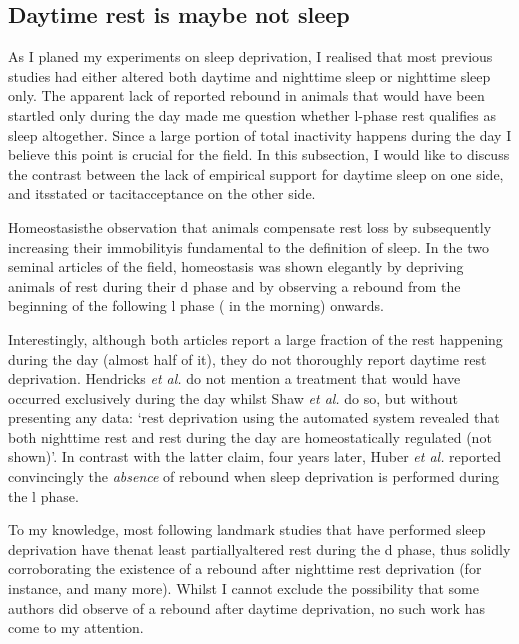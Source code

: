 \subsection{Daytime rest is maybe not sleep}
\label{sec:restoration-in-l}
As I planed my experiments on sleep deprivation, I realised that most previous studies had either altered both daytime and nighttime sleep or nighttime sleep only.
The apparent lack of reported rebound in animals that would have been startled only during the day made me question whether \gls{l}-phase rest qualifies as sleep altogether.
Since a large portion of total inactivity happens during the day I believe this point is crucial for the field.
In this subsection, I would like to discuss the contrast between the lack of empirical support for daytime sleep on one side, and its\emd{}stated or tacit\emd{}acceptance on the other side. 

Homeostasis\emd{}the observation that animals compensate rest loss by subsequently increasing their immobility\emd{}is fundamental to the definition of sleep.
In the two seminal articles of the field, homeostasis was shown elegantly 
by depriving animals of rest during their \gls{d} phase and by observing a rebound from the beginning of the  following \gls{l} phase (\ie{} in the morning) onwards\cite{hendricks_need_2000,shaw_correlates_2000}.

Interestingly, although both articles report a large fraction of the rest happening during the day (almost half of it), they do not thoroughly report daytime rest deprivation.
Hendricks \emph{et al.} do not mention a treatment that would have occurred exclusively during the day\cite{hendricks_need_2000} whilst Shaw \emph{et al.} do so, but without presenting any data: `rest deprivation using the automated system revealed that both nighttime rest and rest during the day are homeostatically regulated (not shown)'\cite{shaw_correlates_2000}.
In contrast with the latter claim, four years later, Huber \emph{et al.} reported convincingly the \emph{absence} of rebound when sleep deprivation is performed during the \gls{l} phase\cite{huber_sleep_2004}.

To my knowledge, most following landmark studies that have performed sleep deprivation have then\emd{}at least partially\emd{}altered rest during the \gls{d} phase, 
thus solidly corroborating the existence of a rebound after nighttime rest deprivation (for instance, \cite{kume_dopamine_2005,cirelli_reduced_2005,pitman_dynamic_2006,joiner_sleep_2006,koh_identification_2008,gilestro_widespread_2009} and many more).
Whilst I cannot exclude the possibility that some authors did observe of a rebound after daytime deprivation, no such work has come to my attention.

